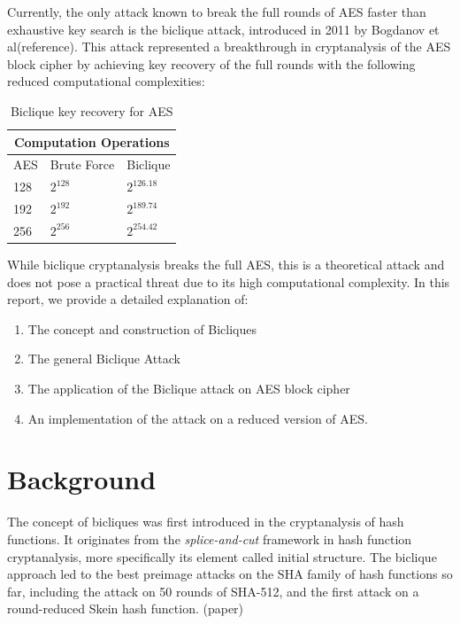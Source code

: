 \documentclass{report}
\begin{document}
Currently, the only attack known to break the full rounds of AES faster than exhaustive key search is the biclique attack, introduced in 2011 by Bogdanov et al(reference). This attack represented a breakthrough in cryptanalysis of the AES block cipher by achieving key recovery of the full rounds with the following reduced computational complexities: 

\begin{table}[h!]
    \centering
    \begin{tabular}{|p{3cm}|p{3cm}|p{3cm}|}
        \hline
        \multicolumn{3}{|c|}{Computation Operations} \\
        \hline
        AES & Brute Force & Biclique \\
        \hline
        128 & $2^{128}$ & $2^{126.18}$ \\
        \hline
        192 & $2^{192}$ & $2^{189.74}$ \\
        \hline
        256 & $2^{256}$ & $2^{254.42}$ \\
        \hline
    \end{tabular}
    \caption{Biclique key recovery for AES}
    \label{table:1}
\end{table}

While biclique cryptanalysis breaks the full AES, this is a theoretical attack and does not pose a practical threat due to its high computational complexity. In this report, we provide a detailed explanation of: 
\begin{enumerate}
    \item     The concept and construction of Bicliques 
    \item     The general Biclique Attack 
    \item     The application of the Biclique attack on AES block cipher 
    \item     An implementation of the attack on a reduced version of AES. 
\end{enumerate}

\newpage
\section{Background}
The concept of bicliques was first introduced in the cryptanalysis of hash functions. It originates from the \emph{splice-and-cut} framework in hash function cryptanalysis, more specifically its element called initial structure. The biclique approach led to the best preimage attacks on the SHA family of hash functions so far, including the attack on 50 rounds of SHA-512, and the first attack on a round-reduced Skein hash function. (paper) 
\end{document}
